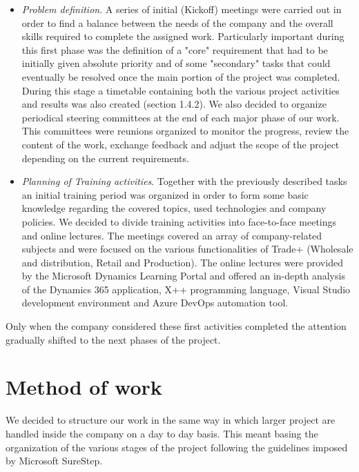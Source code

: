 \begin{itemize}
    \item \textit{Problem definition}. A series of initial (Kickoff) meetings were carried out in order to find a balance between the needs of the company and the overall skills required to complete the assigned work. Particularly important during this first phase was the definition of a "core" requirement that had to be initially given absolute priority and of some "secondary" tasks that could eventually be resolved once the main portion of the project was completed. During this stage a timetable containing both the various project activities and results was also created (section 1.4.2). We also decided to organize periodical steering committees at the end of each major phase of our work. This committees were reunions organized to monitor the progress, review the content of the work, exchange feedback and adjust the scope of the project depending on the current requirements.
    
    \item \textit{Planning of Training activities}. Together with the previously described tasks an initial training period was organized in order to form some basic knowledge regarding the covered topics, used technologies and company policies. We decided to divide training activities into face-to-face meetings and online lectures. The meetings covered an array of company-related subjects and were focused on the various functionalities of Trade+ (Wholesale and distribution, Retail and Production). The online lectures were provided by the Microsoft Dynamics Learning Portal and offered an in-depth analysis of the Dynamics 365 application, X++ programming language, Visual Studio development environment and Azure DevOps automation tool.
\end{itemize}

Only when the company considered these first activities completed the attention gradually shifted to the next phases of the project.

\section{Method of work}

We decided to structure our work in the same way in which larger project are handled inside the company on a day to day basis. This meant basing the organization of the various stages of the project following the guidelines imposed by Microsoft SureStep.

